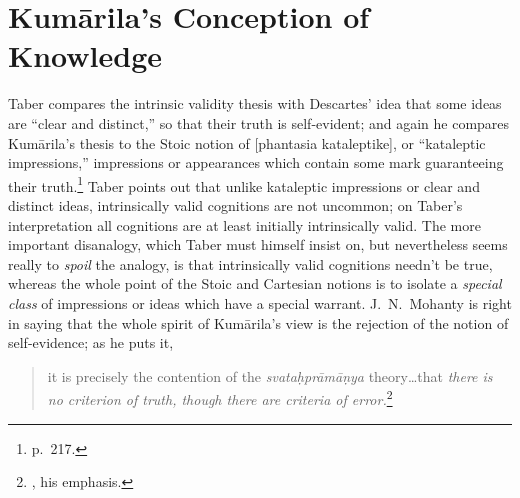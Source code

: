 ﻿\documentclass[11pt]{amsart}
\begin{document}

\section{Kum\=arila's Conception of Knowledge}








Taber compares the intrinsic validity thesis with Descartes' idea that some ideas are ``clear and distinct,'' so that their truth is self-evident; and again he compares Kum\=arila's thesis to the Stoic notion of [phantasia kataleptike], or ``kataleptic impressions,'' impressions or appearances which contain some mark guaranteeing their truth.\footnote{p.~217.} Taber points out that unlike kataleptic impressions or clear and distinct ideas, intrinsically valid cognitions are not uncommon; on Taber's interpretation all cognitions are at least initially intrinsically valid. The more important disanalogy, which Taber must himself insist on, but nevertheless seems really to \emph{spoil} the analogy, is that intrinsically valid cognitions needn't be true, whereas the whole point of the Stoic and Cartesian notions is to isolate a \emph{special class} of impressions or ideas which have a special warrant. J.~N.~Mohanty is right in saying that the whole spirit of Kum\=arila's view is the rejection of the notion of self-evidence; as he puts it,\small\begin{quote}it is precisely the contention of the \emph{svata\d hpr\=am\=a\d nya} theory\ldots that \emph{there is no criterion of truth, though there are criteria of error.}\footnote{\citet[p.~22]{mohanty1989gangesa}, his emphasis.}\end{quote}\normalsize 
\end{document}
